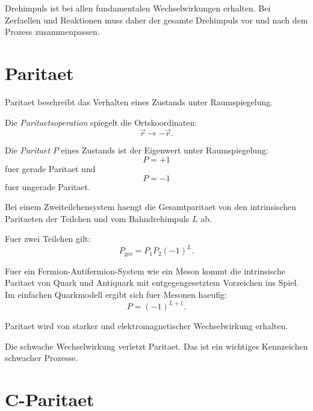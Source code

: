 \begin{conceptbox}
Drehimpuls ist bei allen fundamentalen Wechselwirkungen erhalten.
Bei Zerfaellen und Reaktionen muss daher der gesamte Drehimpuls vor und nach dem
Prozess zusammenpassen.
\end{conceptbox}

\section{Paritaet}

Paritaet beschreibt das Verhalten eines Zustands unter Raumspiegelung.

\begin{definitionbox}
Die \emph{Paritaetsoperation} spiegelt die Ortskoordinaten:
\[
    \vec r \rightarrow -\vec r.
\]
\end{definitionbox}

\begin{definitionbox}
Die \emph{Paritaet} $P$ eines Zustands ist der Eigenwert unter Raumspiegelung:
\[
    P=+1
\]
fuer gerade Paritaet und
\[
    P=-1
\]
fuer ungerade Paritaet.
\end{definitionbox}

\begin{conceptbox}
Bei einem Zweiteilchensystem haengt die Gesamtparitaet von den intrinsischen
Paritaeten der Teilchen und vom Bahndrehimpuls $L$ ab.
\end{conceptbox}

\begin{formulabox}
Fuer zwei Teilchen gilt:
\[
    P_{\mathrm{ges}}
    =
    P_1 P_2 (-1)^L.
\]
\end{formulabox}

\begin{notebox}
Fuer ein Fermion-Antifermion-System wie ein Meson kommt die intrinsische Paritaet
von Quark und Antiquark mit entgegengesetztem Vorzeichen ins Spiel.
Im einfachen Quarkmodell ergibt sich fuer Mesonen haeufig:
\[
    P=(-1)^{L+1}.
\]
\end{notebox}

\begin{examtipbox}
Paritaet wird von starker und elektromagnetischer Wechselwirkung erhalten.

Die schwache Wechselwirkung verletzt Paritaet.
Das ist ein wichtiges Kennzeichen schwacher Prozesse.
\end{examtipbox}

\section{C-Paritaet}

